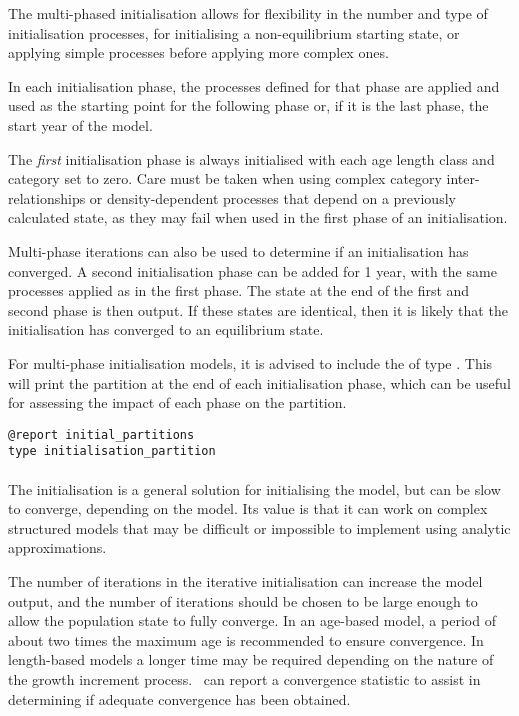 The multi-phased initialisation allows for flexibility in the number and type of initialisation processes, for initialising a non-equilibrium starting state, or applying simple processes before applying more complex ones.

In each initialisation phase, the processes defined for that phase are applied and used as the starting point for the following phase or, if it is the last phase, the start year of the model.

The \emph{first} initialisation phase is always initialised with each \ifAgeBased age \else length class \fi and category set to zero. Care must be taken when using complex category inter-relationships or density-dependent processes that depend on a previously calculated state, as they may fail when used in the first phase of an initialisation.

Multi-phase iterations can also be used to determine if an initialisation has converged. A second initialisation phase can be added for 1 year, with the same processes applied as in the first phase. The state at the end of the first and second phase is then output. If these states are identical, then it is likely that the initialisation has converged to an equilibrium state.

For multi-phase initialisation models, it is advised to include the  of type . This will print the partition at the end of each initialisation phase, which can be useful for assessing the impact of each phase on the partition.

{\small{\begin{verbatim}
@report initial_partitions
type initialisation_partition
\end{verbatim}}}

\paragraph{}\label{sec:InitialisationPhase-Iterative}

The  initialisation is a general solution for initialising the model, but can be slow to converge, depending on the model. Its value is that it can work on complex structured models that may be difficult or impossible to implement using analytic approximations.

The number of iterations in the iterative initialisation can increase the model output, and the number of iterations should be chosen to be large enough to allow the population state to fully converge. In an age-based model, a period of about two times the maximum age is recommended to ensure convergence. In length-based models a longer time may be required depending on the nature of the growth increment process. \CNAME\ can report a convergence statistic to assist in determining if adequate convergence has been obtained.

